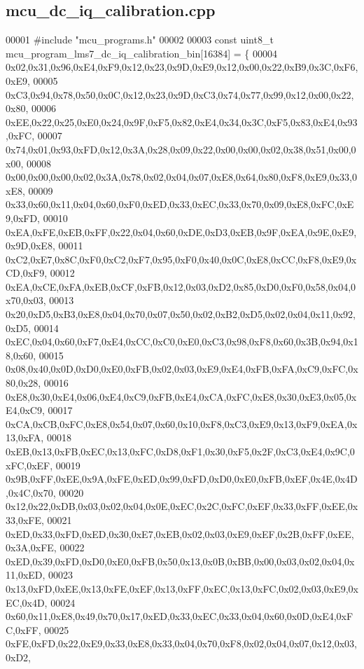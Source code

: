 \subsection{mcu\+\_\+dc\+\_\+iq\+\_\+calibration.\+cpp}
\label{mcu__dc__iq__calibration_8cpp_source}

\begin{DoxyCode}
00001 \textcolor{preprocessor}{#include "mcu_programs.h"}
00002 
00003 \textcolor{keyword}{const} uint8\_t mcu_program_lms7_dc_iq_calibration_bin[16384] = \{
00004 0x02,0x31,0x96,0xE4,0xF9,0x12,0x23,0x9D,0xE9,0x12,0x00,0x22,0xB9,0x3C,0xF6,0xE9,
00005 0xC3,0x94,0x78,0x50,0x0C,0x12,0x23,0x9D,0xC3,0x74,0x77,0x99,0x12,0x00,0x22,0x80,
00006 0xEE,0x22,0x25,0xE0,0x24,0x9F,0xF5,0x82,0xE4,0x34,0x3C,0xF5,0x83,0xE4,0x93,0xFC,
00007 0x74,0x01,0x93,0xFD,0x12,0x3A,0x28,0x09,0x22,0x00,0x00,0x02,0x38,0x51,0x00,0x00,
00008 0x00,0x00,0x00,0x02,0x3A,0x78,0x02,0x04,0x07,0xE8,0x64,0x80,0xF8,0xE9,0x33,0xE8,
00009 0x33,0x60,0x11,0x04,0x60,0xF0,0xED,0x33,0xEC,0x33,0x70,0x09,0xE8,0xFC,0xE9,0xFD,
00010 0xEA,0xFE,0xEB,0xFF,0x22,0x04,0x60,0xDE,0xD3,0xEB,0x9F,0xEA,0x9E,0xE9,0x9D,0xE8,
00011 0xC2,0xE7,0x8C,0xF0,0xC2,0xF7,0x95,0xF0,0x40,0x0C,0xE8,0xCC,0xF8,0xE9,0xCD,0xF9,
00012 0xEA,0xCE,0xFA,0xEB,0xCF,0xFB,0x12,0x03,0xD2,0x85,0xD0,0xF0,0x58,0x04,0x70,0x03,
00013 0x20,0xD5,0xB3,0xE8,0x04,0x70,0x07,0x50,0x02,0xB2,0xD5,0x02,0x04,0x11,0x92,0xD5,
00014 0xEC,0x04,0x60,0xF7,0xE4,0xCC,0xC0,0xE0,0xC3,0x98,0xF8,0x60,0x3B,0x94,0x18,0x60,
00015 0x08,0x40,0x0D,0xD0,0xE0,0xFB,0x02,0x03,0xE9,0xE4,0xFB,0xFA,0xC9,0xFC,0x80,0x28,
00016 0xE8,0x30,0xE4,0x06,0xE4,0xC9,0xFB,0xE4,0xCA,0xFC,0xE8,0x30,0xE3,0x05,0xE4,0xC9,
00017 0xCA,0xCB,0xFC,0xE8,0x54,0x07,0x60,0x10,0xF8,0xC3,0xE9,0x13,0xF9,0xEA,0x13,0xFA,
00018 0xEB,0x13,0xFB,0xEC,0x13,0xFC,0xD8,0xF1,0x30,0xF5,0x2F,0xC3,0xE4,0x9C,0xFC,0xEF,
00019 0x9B,0xFF,0xEE,0x9A,0xFE,0xED,0x99,0xFD,0xD0,0xE0,0xFB,0xEF,0x4E,0x4D,0x4C,0x70,
00020 0x12,0x22,0xDB,0x03,0x02,0x04,0x0E,0xEC,0x2C,0xFC,0xEF,0x33,0xFF,0xEE,0x33,0xFE,
00021 0xED,0x33,0xFD,0xED,0x30,0xE7,0xEB,0x02,0x03,0xE9,0xEF,0x2B,0xFF,0xEE,0x3A,0xFE,
00022 0xED,0x39,0xFD,0xD0,0xE0,0xFB,0x50,0x13,0x0B,0xBB,0x00,0x03,0x02,0x04,0x11,0xED,
00023 0x13,0xFD,0xEE,0x13,0xFE,0xEF,0x13,0xFF,0xEC,0x13,0xFC,0x02,0x03,0xE9,0xEC,0x4D,
00024 0x60,0x11,0xE8,0x49,0x70,0x17,0xED,0x33,0xEC,0x33,0x04,0x60,0x0D,0xE4,0xFC,0xFF,
00025 0xFE,0xFD,0x22,0xE9,0x33,0xE8,0x33,0x04,0x70,0xF8,0x02,0x04,0x07,0x12,0x03,0xD2,

\end{DoxyCode}
